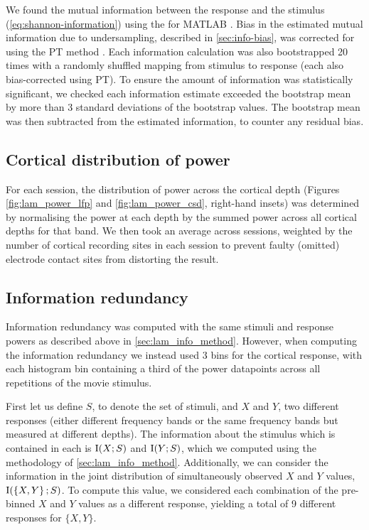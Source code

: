 We found the mutual information between the response and the stimulus (\autoref{eq:shannon-information}) using the  for MATLAB \citep{Magri2009}.
Bias in the estimated mutual information due to undersampling, described in \autoref{sec:info-bias}, was corrected for using the \ac{PT} method \citep{Treves1995}.
Each information calculation was also bootstrapped \num{20} times with a randomly shuffled mapping from stimulus to response (each also bias-corrected using \ac{PT}).
To ensure the amount of information was statistically significant, we checked each information estimate exceeded the bootstrap mean by more than \num{3} standard deviations of the bootstrap values.
The bootstrap mean was then subtracted from the estimated information, to counter any residual bias.


\subsection{Cortical distribution of power}

For each session, the distribution of power across the cortical depth (Figures \ref{fig:lam_power_lfp} and \ref{fig:lam_power_csd}, right-hand insets) was determined by normalising the power at each depth by the summed power across all cortical depths for that band.
We then took an average across sessions, weighted by the number of cortical recording sites in each session to prevent faulty (omitted) electrode contact sites from distorting the result.


\subsection{Information redundancy}
\label{sec:lam_redundancy_method}

Information redundancy was computed with the same stimuli and response powers as described above in \autoref{sec:lam_info_method}.
However, when computing the information redundancy we instead used \num{3} bins for the cortical response, with each histogram bin containing a third of the power datapoints across all repetitions of the movie stimulus.

First let us define $S$, to denote the set of stimuli, and $X$ and $Y$, two different responses (either different frequency bands or the same frequency bands but measured at different depths).
The information about the stimulus which is contained in each is $\operatorname{I}(X;S)$ and $\operatorname{I}(Y;S)$, which we computed using the methodology of \autoref{sec:lam_info_method}.
Additionally, we can consider the information in the joint distribution of simultaneously observed $X$ and $Y$ values,\\$\operatorname{I}(\left\{X,Y\right\};S)$.
To compute this value, we considered each combination of the pre-binned $X$ and $Y$ values as a different response, yielding a total of \num{9} different responses for $\{X,Y\}$.

